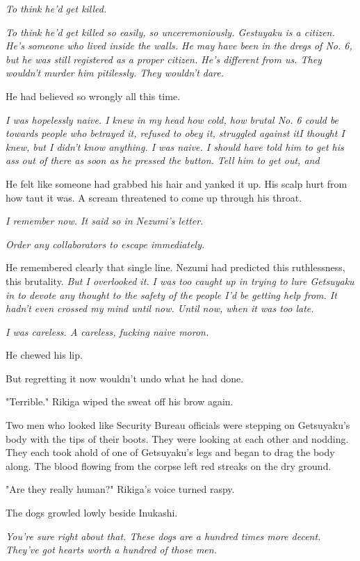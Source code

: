 \emph{To think he'd get killed.}

\emph{To think he'd get killed so easily, so unceremoniously. Gestuyaku is a
citizen. He's someone who lived inside the walls. He may have been in
the dregs of No. 6, but he was still registered as a proper citizen.
He's different from us. They wouldn't murder him pitilessly. They wouldn't dare.}

He had believed so wrongly all this time.

\emph{I was hopelessly naive. I knew in my head how cold, how brutal No. 6
could be towards people who betrayed it, refused to obey it, struggled
against it\el I thought I knew, but I didn't know anything. I was naive.
I should have told him to get his ass out of there as soon as he pressed
the button. Tell him to get out, and\el }

He felt like someone had grabbed his hair and yanked it up. His scalp
hurt from how taut it was. A scream threatened to come up through his
throat.

\emph{I remember now. It said so in Nezumi's letter.}

\emph{Order any collaborators to escape immediately.}

He remembered clearly that single line. Nezumi had predicted this
ruthlessness, this brutality. \emph{But I overlooked it. I was too caught up
in trying to lure Getsuyaku in to devote any thought to the safety of
the people I'd be getting help from. It hadn't even crossed my mind
until now. Until now, when it was too late.}

\emph{I was careless. A careless, fucking naive moron.}

He chewed his lip.

But regretting it now wouldn't undo what he had done.

"Terrible." Rikiga wiped the sweat off his brow again.

Two men who looked like Security Bureau officials were stepping on
Getsuyaku's body with the tips of their boots. They were looking at each
other and nodding. They each took ahold of one of Getsuyaku's legs and
began to drag the body along. The blood flowing from the corpse left red
streaks on the dry ground.

"Are they really human?" Rikiga's voice turned raspy.

The dogs growled lowly beside Inukashi.

\emph{You're sure right about that. These dogs are a hundred times more
decent. They've got hearts worth a hundred of those men.}

